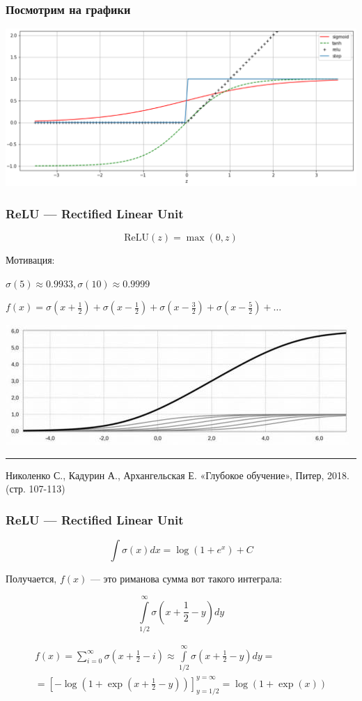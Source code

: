 \documentclass[fullscreen=true, bookmarks=true, hyperref={pdfencoding=unicode}]{beamer}
\begin{document}
\begin{frame}
  \frametitle{Посмотрим на графики}
  \begin{center}
    \includegraphics[keepaspectratio,
                     width=0.7\paperwidth]{sigm_relu.png}
  \end{center}
\end{frame}

\begin{frame}
  \frametitle{ReLU — Rectified Linear Unit}
  $$\text{ReLU}(z) = \max(0, z)$$

  Мотивация:

  $\sigma(5) \approx 0.9933, \sigma(10) \approx 0.9999$

  $f(x) = \sigma(x + \frac12) + \sigma(x - \frac12) + \sigma(x - \frac32) + \sigma(x - \frac52) + \dots$

  \begin{center}
    \includegraphics[keepaspectratio,
                     width=0.7\paperwidth]{from_nikolenko.jpg}
  \end{center}

  \noindent\rule{8cm}{0.4pt}

  Николенко С., Кадурин А., Архангельская Е. «Глубокое обучение», Питер, 2018. (стр. 107-113)
\end{frame}

\begin{frame}
  \frametitle{ReLU — Rectified Linear Unit}
  $$\int \sigma(x) dx = \log(1 + e^x) + C$$

  Получается, $f(x)$ — это риманова сумма вот такого интеграла:

  $$\int\limits_{1/2}^\infty \sigma(x + \frac12 - y) dy $$

  \begin{multline*}
    f(x) = \sum\limits_{i=0}^\infty \sigma(x + \frac12 - i) \approx \int \limits_{1/2}^\infty \sigma(x + \frac12 - y) dy = \\
    = [-\log(1 + \exp(x+\frac12 - y))]_{y=1/2}^{y=\infty} = \log(1 + \exp(x))
  \end{multline*}
\end{frame}
\end{document}
